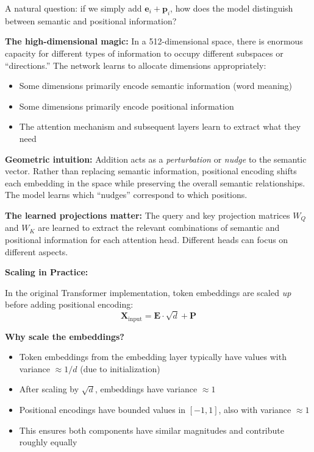 \documentclass{article}
\begin{document}
\begin{tcolorbox}[colback=blue!5!white, colframe=blue!50!black, title=How Does Addition Work? Disentanglement in High Dimensions]
A natural question: if we simply add $\mathbf{e}_i + \mathbf{p}_i$, how does the model distinguish between semantic and positional information?

\textbf{The high-dimensional magic:} In a 512-dimensional space, there is enormous capacity for different types of information to occupy different subspaces or ``directions.'' The network learns to allocate dimensions appropriately:
\begin{itemize}
\item Some dimensions primarily encode semantic information (word meaning)
\item Some dimensions primarily encode positional information
\item The attention mechanism and subsequent layers learn to extract what they need
\end{itemize}

\textbf{Geometric intuition:} Addition acts as a \textit{perturbation} or \textit{nudge} to the semantic vector. Rather than replacing semantic information, positional encoding shifts each embedding in the space while preserving the overall semantic relationships. The model learns which ``nudges'' correspond to which positions.

\textbf{The learned projections matter:} The query and key projection matrices $W_Q$ and $W_K$ are learned to extract the relevant combinations of semantic and positional information for each attention head. Different heads can focus on different aspects.
\end{tcolorbox}

\textbf{Scaling in Practice:}

In the original Transformer implementation, token embeddings are scaled \textit{up} before adding positional encoding:
\[
\mathbf{X}_{\text{input}} = \mathbf{E} \cdot \sqrt{d} + \mathbf{P}
\]

\textbf{Why scale the embeddings?}
\begin{itemize}
\item Token embeddings from the embedding layer typically have values with variance $\approx 1/d$ (due to initialization)
\item After scaling by $\sqrt{d}$, embeddings have variance $\approx 1$
\item Positional encodings have bounded values in $[-1, 1]$, also with variance $\approx 1$
\item This ensures both components have similar magnitudes and contribute roughly equally
\end{itemize}
\end{document}
